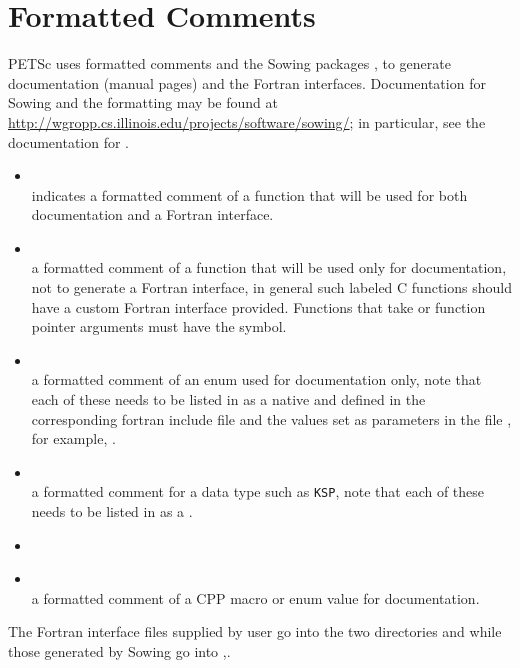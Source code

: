 \section{Formatted Comments}

PETSc uses formatted comments and the Sowing packages \cite{gropp1993sowing}, \cite{gropp1993sowing2} to generate documentation (manual pages) and the Fortran interfaces. 
Documentation for Sowing and the formatting may be found at \href{http://wgropp.cs.illinois.edu/projects/software/sowing/}{http://wgropp.cs.illinois.edu/projects/software/sowing/}; in particular, see the documentation for .

\begin{itemize}
    \item
      \\      indicates a formatted comment of a function that will be used for
        both documentation and a Fortran interface.
    \item
      \\    a formatted comment of a function that will be used only for
        documentation, not to generate a Fortran interface, in general such labeled C functions should have a custom Fortran interface provided. Functions that take  or function pointer arguments must have the  symbol. 
    \item
      \\     a formatted comment of an enum used for documentation only, note that
        each of these needs to be listed in  as
        a native and defined in the corresponding
         fortran include file and the values
        set as parameters in the file , for example, .
    \item
      \\     a formatted comment for a data type such as \lstinline{KSP}, note that each of these
        needs to be listed in  as a .
    \item
    \item
      \\    a formatted comment of a CPP macro or enum value for documentation.
\end{itemize}

The Fortran interface files supplied by user go into the two directories   and  while those generated by Sowing go into ,.

